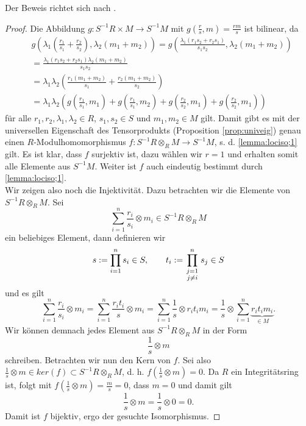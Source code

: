 \documentclass[11pt,titlepage]{article}
\theoremstyle{definition}
\theoremstyle{remark}
\begin{document}
	Der Beweis richtet sich nach \cite[Proposition 3.5]{introductiontocomalg}.
	
	\begin{proof}
		Die Abbildung $g:S^{-1}R\times M\to S^{-1}M$ mit $g\left(\frac{r}{s},m\right)=\frac{rm}{s}$ ist bilinear, da 
		\begin{align*}
			&g\left(\lambda_1\left(\frac{r_1}{s_1}+\frac{r_2}{s_2}\right),
			\lambda_2 (m_1+m_2)\right)=g\left(\frac{\lambda_1 (r_1 s_2+r_2
			 s_1)}{s_1s_2},\lambda_2(m_1+m_2)\right) \\
			&=\frac{\lambda_1(r_1s_2+r_2s_1)\lambda_2(m_1+m_2)}{s_1s_2}\\
			&=\lambda_1\lambda_2\left(\frac{r_1(m_1+m_2)}{s_1}+
			\frac{r_2(m_1+m_2)}{s_2}\right) \\
			&=\lambda_1\lambda_2 \left(g\left(\frac{r_1}{s_1},m_1\right)
			+g\left(\frac{r_1}{s_1},m_2\right)+g\left(\frac{r_2}{s_2},m_1\right)+
			g\left(\frac{r_2}{s_2},m_1\right)\right)
		\end{align*}
		für alle $r_1,r_2,\lambda_1,\lambda_2\in R$, $s_1,s_2 \in S$ und 
		$m_1,m_2\in M$ gilt. Damit gibt es mit der universellen Eigenschaft 
		des Tensorprodukts (Proposition \ref{prop:univeig}) genau einen 
		$R$-Modulhomomorphismus $f:S^{-1}R\otimes_R M\to S^{-1}M$, s. d. 
		\ref{lemma:lociso;1} gilt. Es ist klar, dass $f$ surjektiv ist, 
		dazu wählen wir $r=1$ und erhalten somit alle Elemente aus 
		$S^{-1}M$. Weiter ist $f$ auch eindeutig bestimmt durch 
		\ref{lemma:lociso;1}. \\
		Wir zeigen also noch die Injektivität. Dazu betrachten wir die 
		Elemente von $S^{-1}R\otimes_R M$. Sei  
		\[\sum_{i=1}^n \frac{r_i}{s_i}\otimes m_i \in S^{-1}R\otimes_R M\]
		ein beliebiges Element, dann definieren wir
		\[s:=\prod_{i=1}^n s_i\in S,\qquad t_i:=\prod_{\genfrac{}{}{0pt}{1}{j=1}{j\neq i}}^n s_j\in S\]
		und es gilt 
		\[\sum_{i=1}^n \frac{r_i}{s_i}\otimes m_i =
		\sum_{i=1}^n \frac{r_it_i}{s}\otimes m_i =\sum_{i=1}^n 
		\frac{1}{s}\otimes r_i t_i m_i =\frac{1}{s}\otimes\sum_{i=1}^n
		\underbrace{r_it_im_i}_{\in M}.\]
		Wir können demnach jedes Element aus $S^{-1}R\otimes_R M$ in der Form 
		\[\frac{1}{s}\otimes m\]
		schreiben. Betrachten wir nun den Kern von $f$. Sei also 
		$\frac{1}{s}\otimes m \in ker(f)\subset S^{-1}R\otimes_R M$, d. h. 
		$f\left(\frac{1}{s}\otimes m\right)=0$. Da $R$ ein 
		Integritätsring ist, folgt mit $f\left(\frac{1}{s}\otimes m\right)=\frac{m}{s}=0$, dass $m=0$ und damit gilt
		\[\frac{1}{s}\otimes m =\frac{1}{s}\otimes 0=0.\]
		Damit ist $f$ bijektiv, ergo der gesuchte Isomorphismus.
	\end{proof}
	
\end{document}
